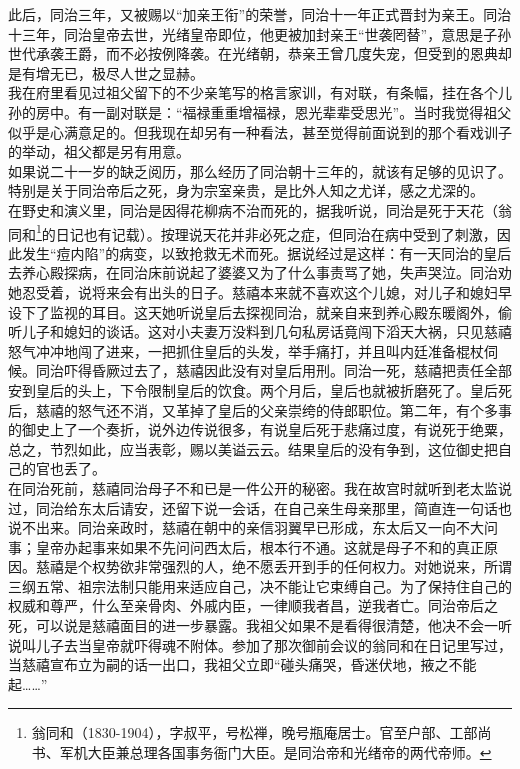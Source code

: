   此后，同治三年，又被赐以“加亲王衔”的荣誉，同治十一年正式晋封为亲王。同治十三年，同治皇帝去世，光绪皇帝即位，他更被加封亲王“世袭罔替”，意思是子孙世代承袭王爵，而不必按例降袭。在光绪朝，恭亲王曾几度失宠，但受到的恩典却是有增无已，极尽人世之显赫。\\

  我在府里看见过祖父留下的不少亲笔写的格言家训，有对联，有条幅，挂在各个儿孙的房中。有一副对联是：“福禄重重增福禄，恩光辈辈受思光”。当时我觉得祖父似乎是心满意足的。但我现在却另有一种看法，甚至觉得前面说到的那个看戏训子的举动，祖父都是另有用意。\\

  如果说二十一岁的缺乏阅历，那么经历了同治朝十三年的，就该有足够的见识了。特别是关于同治帝后之死，身为宗室亲贵，是比外人知之尤详，感之尤深的。\\

  在野史和演义里，同治是因得花柳病不治而死的，据我听说，同治是死于天花（翁同和\footnote{翁同和（1830-1904），字叔平，号松禅，晚号瓶庵居士。官至户部、工部尚书、军机大臣兼总理各国事务衙门大臣。是同治帝和光绪帝的两代帝师。}的日记也有记载）。按理说天花并非必死之症，但同治在病中受到了刺激，因此发生“痘内陷”的病变，以致抢救无术而死。据说经过是这样：有一天同治的皇后去养心殿探病，在同治床前说起了婆婆又为了什么事责骂了她，失声哭泣。同治劝她忍受着，说将来会有出头的日子。慈禧本来就不喜欢这个儿媳，对儿子和媳妇早设下了监视的耳目。这天她听说皇后去探视同治，就亲自来到养心殿东暖阁外，偷听儿子和媳妇的谈话。这对小夫妻万没料到几句私房话竟闯下滔天大祸，只见慈禧怒气冲冲地闯了进来，一把抓住皇后的头发，举手痛打，并且叫内廷准备棍杖伺候。同治吓得昏厥过去了，慈禧因此没有对皇后用刑。同治一死，慈禧把责任全部安到皇后的头上，下令限制皇后的饮食。两个月后，皇后也就被折磨死了。皇后死后，慈禧的怒气还不消，又革掉了皇后的父亲崇绔的侍郎职位。第二年，有个多事的御史上了一个奏折，说外边传说很多，有说皇后死于悲痛过度，有说死于绝粟，总之，节烈如此，应当表彰，赐以美谥云云。结果皇后的没有争到，这位御史把自己的官也丢了。\\

  在同治死前，慈禧同治母子不和已是一件公开的秘密。我在故宫时就听到老太监说过，同治给东太后请安，还留下说一会话，在自己亲生母亲那里，简直连一句话也说不出来。同治亲政时，慈禧在朝中的亲信羽翼早已形成，东太后又一向不大问事；皇帝办起事来如果不先问问西太后，根本行不通。这就是母子不和的真正原因。慈禧是个权势欲非常强烈的人，绝不愿丢开到手的任何权力。对她说来，所谓三纲五常、祖宗法制只能用来适应自己，决不能让它束缚自己。为了保持住自己的权威和尊严，什么至亲骨肉、外戚内臣，一律顺我者昌，逆我者亡。同治帝后之死，可以说是慈禧面目的进一步暴露。我祖父如果不是看得很清楚，他决不会一听说叫儿子去当皇帝就吓得魂不附体。参加了那次御前会议的翁同和在日记里写过，当慈禧宣布立为嗣的话一出口，我祖父立即“碰头痛哭，昏迷伏地，掖之不能起……”\\

